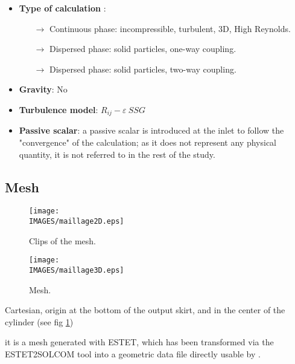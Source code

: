 \begin{itemize}

   \item \textbf{Type of calculation} :
         \begin{itemize}
            \item[$\rightarrow$] Continuous phase: incompressible, turbulent, 3D, High Reynolds.
            \item[$\rightarrow$] Dispersed phase: solid particles, one-way coupling.
            \item[$\rightarrow$] Dispersed phase: solid particles, two-way coupling.
         \end{itemize}

   \item \textbf{Gravity}: No

   \item \textbf{Turbulence model}: $R_{ij}-\varepsilon~SSG$
   
   \item \textbf{Passive scalar}: a passive scalar is introduced at the inlet to follow the "convergence" of the
calculation; as it does not represent any physical quantity, it is not referred to in the rest of
the study.


\end{itemize}

\subsection{Mesh}

\begin{description}

\begin{figure}[H]
   \centerline{\texttt{[image: \\IMAGES/maillage2D.eps]}}
   \caption{Clips of the mesh.}
   \label{mail2D}
\end{figure}

\begin{figure}[H]
   \centerline{\texttt{[image: \\IMAGES/maillage3D.eps]}}
   \caption{Mesh.}
   \label{mail3D}
\end{figure}

   \item[\textbf{Coordinate system}:] Cartesian, origin at the bottom of the output skirt, and in the center of the cylinder (see fig \ref{mail2D})

   \item[\textbf{Process used to build the mesh} :] it is a mesh generated with ESTET, which has been transformed via the ESTET2SOLCOM tool into a geometric data file directly
usable by \CS.




\end{description}

